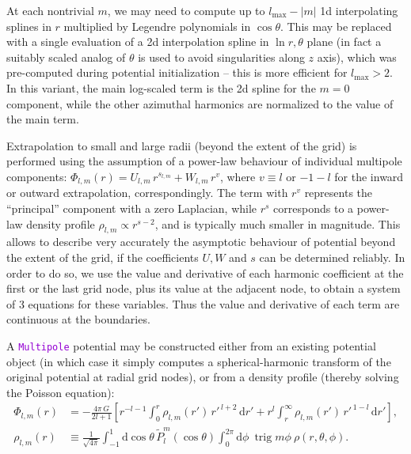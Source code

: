 \documentclass[12pt]{article}
\newcommand{\ttt}[1]{\textcolor{darkviolet}{\texttt{#1}}}
\renewcommand{\d}{\mathrm{d}}
\DeclareMathOperator{\trig}{trig}
\begin{document}
At each nontrivial $m$, we may need to compute up to $l_\mathrm{max}-|m|$ 1d interpolating splines in $r$ multiplied by Legendre polynomials in $\cos\theta$. This may be replaced with a single evaluation of a 2d interpolation spline in $\ln r,\theta$ plane (in fact a suitably scaled analog of $\theta$ is used to avoid singularities along $z$ axis), which was pre-computed during potential initialization -- this is more efficient for $l_\mathrm{max}>2$. In this variant, the main log-scaled term is the 2d spline for the $m=0$ component, while the other azimuthal harmonics are normalized to the value of the main term.

Extrapolation to small and large radii (beyond the extent of the grid) is performed using the assumption of a power-law behaviour of individual multipole components: $\Phi_{l,m}(r) = U_{l,m}\, r^{s_{l,m}} + W_{l,m}\, r^{v}$, where $v\equiv l$ or $-1-l$ for the inward or outward extrapolation, correspondingly. The term with $r^v$ represents the ``principal'' component with a zero Laplacian, while $r^s$ corresponds to a power-law density profile $\rho_{l,m}\propto r^{s-2}$, and is typically much smaller in magnitude. This allows to describe very accurately the asymptotic behaviour of potential beyond the extent of the grid, if the coefficients $U,W$ and $s$ can be determined reliably. In order to do so, we use the value and derivative of each harmonic coefficient at the first or the last grid node, plus its value at the adjacent node, to obtain a system of 3 equations for these variables. Thus the value and derivative of each term are continuous at the boundaries. 

A \ttt{Multipole} potential may be constructed either from an existing potential object (in which case it simply computes a spherical-harmonic transform of the original potential at radial grid nodes), or from a density profile (thereby solving the Poisson equation):
\begin{align}
\Phi_{l,m}(r) &= -\frac{4\pi\,G}{2l+1} \left[ r^{-l-1} \int_0^r \rho_{l,m}(r')\,{r'}^{\,l+2}\,\d r' + r^l\int_r^\infty \rho_{l,m}(r')\,{r'}^{\,1-l}\,\d r' \right],  \label{eq:SphHarmPoisson} \\
\rho_{l,m}(r) &\equiv \frac{1}{\sqrt{4\pi}} \int_{-1}^1 \d \cos\theta\, \tilde P_l^m(\cos\theta) \int_0^{2\pi}\d \phi\:\trig m\phi\:\rho(r,\theta,\phi) .  \label{eq:SphHarmDensity}
\end{align}
\end{document}
